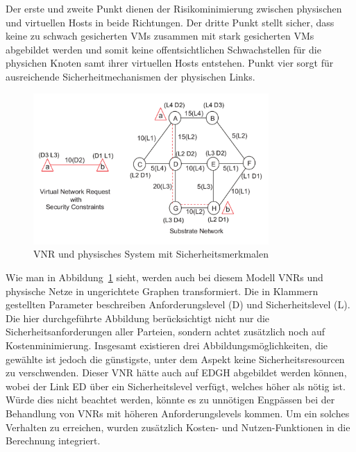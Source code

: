\documentclass{lni}
\begin{document}
Der erste und zweite Punkt dienen der Risikominimierung zwischen physischen und virtuellen Hosts in beide Richtungen. Der dritte Punkt stellt sicher, dass keine zu schwach gesicherten VMs zusammen mit stark gesicherten VMs abgebildet werden und somit keine offentsichtlichen Schwachstellen für die physichen Knoten samt ihrer virtuellen Hosts entstehen. Punkt vier sorgt für ausreichende Sicherheitmechanismen der physischen Links.

\begin{figure}[htb]
\begin{center}
	\includegraphics[width=0.8\textwidth]{algo2graph.pdf}\newline
	\caption{\label{graph11} VNR und physisches System mit Sicherheitsmerkmalen\cite{algo2}}
\end{center}
\end{figure}

Wie man in Abbildung~\ref{graph11} sieht, werden auch bei diesem Modell VNRs und physische Netze in ungerichtete Graphen transformiert. Die in Klammern gestellten Parameter beschreiben Anforderungslevel (D) und Sicherheitslevel (L). Die hier durchgeführte Abbildung berücksichtigt nicht nur die Sicherheitsanforderungen aller Parteien, sondern achtet zusätzlich noch auf Kostenminimierung. Insgesamt existieren drei Abbildungsmöglichkeiten, die gewählte ist jedoch die günstigste, unter dem Aspekt keine Sicherheitsresourcen zu verschwenden. Dieser VNR hätte auch auf EDGH abgebildet werden können, wobei der Link ED über ein Sicherheitslevel verfügt, welches höher als nötig ist. Würde dies nicht beachtet werden, könnte es zu unnötigen Engpässen bei der Behandlung von VNRs mit höheren Anforderungslevels kommen. Um ein solches Verhalten zu erreichen, wurden zusätzlich Kosten- und Nutzen-Funktionen in die Berechnung integriert.
\end{document}
